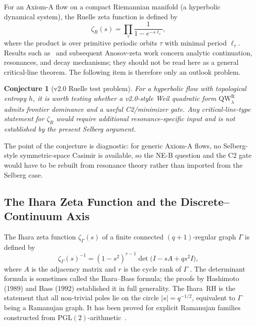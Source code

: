\documentclass[12pt,a4paper]{article}
\newtheorem{conjecture}[theorem]{Conjecture}
\theoremstyle{definition}
\theoremstyle{remark}
\newcommand{\QW}{\mathrm{QW}}
\begin{document}
For an Axiom-A flow on a compact Riemannian manifold (a hyperbolic dynamical
system), the Ruelle zeta function is defined by
\begin{equation}
\zeta_R(s) = \prod_\tau \frac{1}{1 - e^{-s\ell_\tau}},
\end{equation}
where the product is over primitive periodic orbits $\tau$ with minimal
period $\ell_\tau$.  Results such as~\cite{Dolgopyat1998} and subsequent
Anosov-zeta work concern analytic continuation, resonances, and decay
mechanisms; they should not be read here as a general critical-line theorem.
The following item is therefore only an outlook problem.

\begin{conjecture}[v2.0 Ruelle test problem]
\label{conj:Ruelle}
For a hyperbolic flow with topological entropy $h$, it is worth testing
whether a v2.0-style Weil quadratic form $\QW^\mathrm{R}_\lambda$ admits
frontier dominance and a useful C2/minimizer gate. Any critical-line-type
statement for $\zeta_R$ would require additional resonance-specific input and
is not established by the present Selberg argument.
\end{conjecture}

The point of the conjecture is diagnostic: for generic Axiom-A flows, no
Selberg-style symmetric-space Casimir is available, so the NE-B question and
the C2 gate would have to be rebuilt from resonance theory rather than
imported from the Selberg case.

\subsection{\texorpdfstring{The Ihara Zeta Function and the Discrete--Continuum Axis}{The Ihara Zeta Function and the Discrete-Continuum Axis}}
\label{sec:ihara}

The Ihara zeta function $\zeta_\Gamma(s)$ of a finite connected $(q+1)$-regular
graph $\Gamma$ is defined by
\begin{equation}
\zeta_\Gamma(s)^{-1}
  = (1-s^2)^{r-1}\det\!\bigl(I - sA + qs^2 I\bigr),
\end{equation}
where $A$ is the adjacency matrix and $r$ is the cycle rank of $\Gamma$
\cite{Ihara1966,Hashimoto1989,Bass1992}.  The determinant formula
is sometimes called the Ihara--Bass formula; the proofs by Hashimoto (1989)
and Bass (1992) established it in full generality.  The Ihara~RH is the statement that all
non-trivial poles lie on the circle $|s| = q^{-1/2}$, equivalent to
$\Gamma$ being a Ramanujan graph.  It has been proved for explicit
Ramanujan families constructed from $\mathrm{PGL}(2)$-arithmetic~\cite{LPS1988}.
\end{document}
